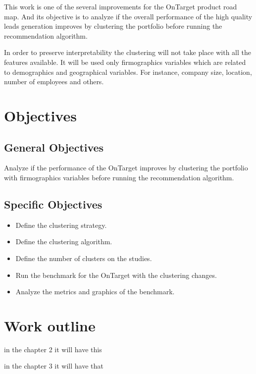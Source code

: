 This work is one of the several improvements for the OnTarget product road map. And its objective is to analyze if the overall performance of the high quality leads generation improves by clustering the portfolio before running the recommendation algorithm. 

In order to preserve interpretability the clustering will not take place with all the features available. It will be used only firmographics \cite{wikipedia_firmographics} variables which are related to demographics and geographical variables. For instance, company size, location, number of employees and others. 

\section{Objectives}

\subsection{General Objectives}

Analyze if the performance of the OnTarget improves by clustering the portfolio with firmographics variables before running the recommendation algorithm.

\subsection{Specific Objectives}

\begin{itemize}
    \item Define the clustering strategy.
	\item Define the clustering algorithm.
    \item Define the number of clusters on the studies.
    \item Run the benchmark for the OnTarget with the clustering changes.
    \item Analyze the metrics and graphics of the benchmark.
\end{itemize}


\section{Work outline}

in the chapter 2 it will have this

in the chapter 3 it will have that
 
